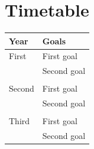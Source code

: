 \documentclass[a4,useAMS,usenatbib,usegraphicx,12pt]{article}
\begin{document}
\section{Timetable}

\begin{table}[h]
\begin{flushleft}
\begin{center}
  \begin{tabular}{l  l} \hline\hline
	\centering\textbf{Year} & \textbf{Goals} \\ \hline
	First  
	& \tabitem First goal \\
	& \tabitem Second goal\\
	
	\\
	Second
	& \tabitem First goal \\
	& \tabitem Second goal\\

	\\	
	Third
	& \tabitem First goal \\
	& \tabitem Second goal\\ 
	
	\hline\hline
  \end{tabular}  
\end{center}
\end{flushleft}
\end{table}



\renewcommand{\bibname}{8\ \ \ \ Bibliography}

\end{document}
